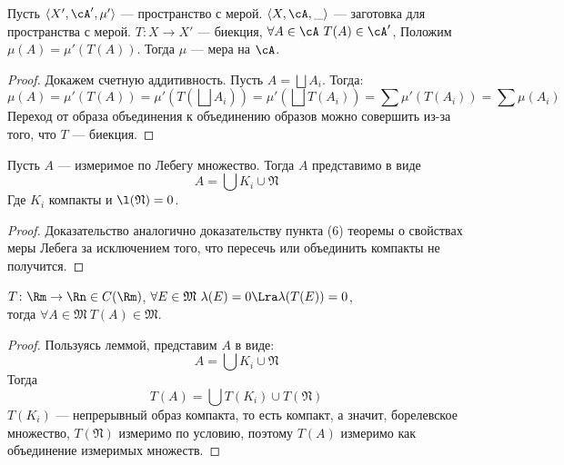 \begin{lemma}

    Пусть $\langle X', \cA', \mu' \rangle$ --- пространство с мерой.
    $\langle X, \cA, \_ \rangle$ --- заготовка для пространства с мерой.
    $T \colon X \to X'$ --- биекция, $\forall A \in \cA~ T(A) \in \cA'$,
    Положим $\mu(A) = \mu'(T(A))$. Тогда
    $\mu$ --- мера на $\cA$.
\end{lemma}
\begin{proof}
	Докажем счетную аддитивность. Пусть $A = \bigsqcup{A_i}$. Тогда:
\[
	\mu(A) = \mu'(T(A)) = \mu'\left(T\left(\bigsqcup{A_i}\right)\right) 
	= \mu'\left(\bigsqcup{T(A_i)}\right) 
	= \sum{\mu'(T(A_i))} = \sum{\mu(A_i)}
\]
	Переход от образа объединения к объединению образов можно совершить из-за 
	того, что $T$ --- биекция.
\end{proof}

\begin{lemma}
	Пусть $A$ --- измеримое по Лебегу множество. Тогда $A$ представимо в виде 
\[
	A = \bigcup{K_i} \cup \mathfrak{N}
\]
	Где $K_i$ компакты и $\l(\mathfrak{N}) = 0$.
\end{lemma}
\begin{proof}
	Доказательство аналогично доказательству пункта (6) теоремы о свойствах меры Лебега 
	за исключением того, что пересечь или объединить компакты не получится.
\end{proof}

\begin{lemma}
    $T \colon \Rm \to \Rn \in C(\Rm)$, $\forall E \in \mathfrak{M}~ \lambda(E) = 0
    \Lra \lambda(T(E)) = 0$, \\ тогда $\forall A \in \mathfrak{M}~ T(A) \in \mathfrak{M}$.
\end{lemma}
\begin{proof}
	Пользуясь леммой, представим $A$ в виде:
\[
	A = \bigcup{K_i} \cup \mathfrak{N}
\]
	Тогда
\[
	T(A) = \bigcup{T(K_i)} \cup T(\mathfrak{N})
\]
	$T(K_i)$ --- непрерывный образ компакта, то есть компакт, а значит, борелевское множество,
	$T(\mathfrak{N})$ измеримо по условию, поэтому $T(A)$ измеримо как объединение измеримых 
	множеств.
\end{proof}


